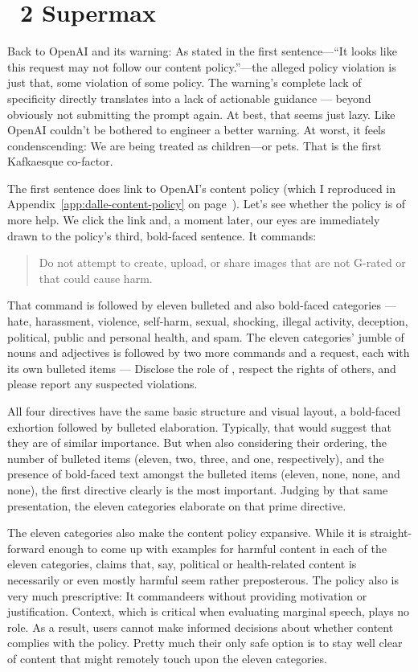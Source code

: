 \section{\DDAALLEE\ 2 Supermax}
\label{sec:dalle}

Back to OpenAI and its warning: As stated in the first sentence---``It looks
like this request may not follow our content policy.''---the alleged policy
violation is just that, some violation of some policy. The warning's complete
lack of specificity directly translates into a lack of actionable guidance —
beyond obviously not submitting the prompt again. At best, that seems just lazy.
Like OpenAI couldn't be bothered to engineer a better warning. At worst, it
feels condenscending: We are being treated as children---or pets. That is the
first Kafkaesque co-factor.

The first sentence does link to OpenAI's content policy (which I reproduced in
Appendix~\ref{app:dalle-content-policy} on
page~\pageref{app:dalle-content-policy}). Let's see whether the policy is of
more help. We click the link and, a moment later, our eyes are immediately drawn
to the policy's third, bold-faced sentence. It commands:

\begin{quote}
\openfat{}Do not attempt to create, upload, or share images that are not
G-rated or that could cause harm.\closefat{}
\end{quote}

\noindent{}That command is followed by eleven bulleted and also bold-faced
categories — hate, harassment, violence, self-harm, sexual, shocking, illegal
activity, deception, political, public and personal health, and spam. The eleven
categories' jumble of nouns and adjectives is followed by two more commands and
a request, each with its own bulleted items — Disclose the role of , respect
the rights of others, and please report any suspected violations.

All four directives have the same basic structure and visual layout, a
bold-faced exhortion followed by bulleted elaboration. Typically, that would
suggest that they are of similar importance. But when also considering their
ordering, the number of bulleted items (eleven, two, three, and one,
respectively), and the presence of bold-faced text amongst the bulleted items
(eleven, none, none, and none), the first directive clearly is the most
important. Judging by that same presentation, the eleven categories elaborate on
that prime directive.

The eleven categories also make the content policy expansive. While it is
straight-forward enough to come up with examples for harmful content in each of
the eleven categories, claims that, say, political or health-related content is
necessarily or even mostly harmful seem rather preposterous. The policy also is
very much prescriptive: It commandeers without providing motivation or
justification. Context, which is critical when evaluating marginal speech, plays
no role. As a result, users cannot make informed decisions about whether content
complies with the policy. Pretty much their only safe option is to stay well
clear of content that might remotely touch upon the eleven categories.

